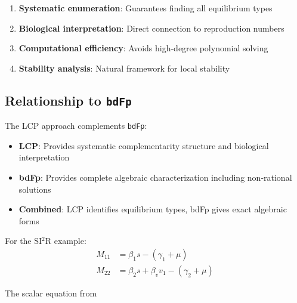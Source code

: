\begin{enumerate}
\item \textbf{Systematic enumeration}: Guarantees finding all equilibrium types
\item \textbf{Biological interpretation}: Direct connection to reproduction numbers
\item \textbf{Computational efficiency}: Avoids high-degree polynomial solving
\item \textbf{Stability analysis}: Natural framework for local stability
\end{enumerate}

\subsection{Relationship to \texttt{bdFp}}

The LCP approach complements \texttt{bdFp}:
\begin{itemize}
\item \textbf{LCP}: Provides systematic complementarity structure and biological interpretation
\item \textbf{bdFp}: Provides complete algebraic characterization including non-rational solutions
\item \textbf{Combined}: LCP identifies equilibrium types, bdFp gives exact algebraic forms
\end{itemize}

For the SI$^2$R example:
\begin{align}
M_{11} &= \beta_1 s - (\gamma_1 + \mu) \\
M_{22} &= \beta_2 s + \beta_v v_1 - (\gamma_2 + \mu)
\end{align}

The scalar equation from \text 